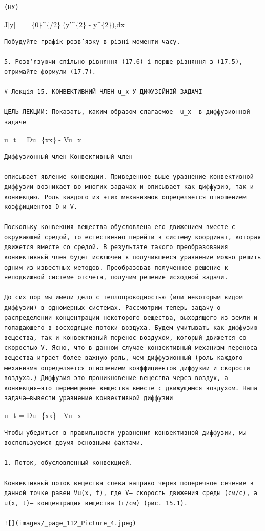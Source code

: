 \documentclass[
  ukrainian,
]{article}
\begin{document}
\begin{verbatim}
(НУ)
\end{verbatim}

J{[}y{]} = \int\_\{0\}\^{}\{\pi/2\} (y'\^{}\{2\} - y\^{}\{2\}),dx

\begin{verbatim}
Побудуйте графік розв’язку в різні моменти часу.

5. Розв’язуючи спільно рівняння (17.6) і перше рівняння з (17.5), отримайте формули (17.7).

# Лекція 15. КОНВЕКТИВНИЙ ЧЛЕН u_x У ДИФУЗІЙНІЙ ЗАДАЧІ

ЦЕЛЬ ЛЕКЦИИ: Показать, каким образом слагаемое  u_x  в диффузионной задаче
\end{verbatim}

u\_t = Du\_\{xx\} - Vu\_x

\begin{verbatim}
Диффузионный член Конвективный член

описывает явление конвекции. Приведенное выше уравнение конвективной диффузии возникает во многих задачах и описывает как диффузию, так и конвекцию. Роль каждого из этих механизмов определяется отношением коэффициентов D и V.

Поскольку конвекция вещества обусловлена его движением вместе с окружающей средой, то естественно перейти в систему координат, которая движется вместе со средой. В результате такого преобразования конвективный член будет исключен в получившееся уравнение можно решить одним из известных методов. Преобразовав полученное решение к неподвижной системе отсчета, получим решение исходной задачи.

До сих пор мы имели дело с теплопроводностью (или некоторым видом диффузии) в одномерных системах. Рассмотрим теперь задачу о распределении концентрации некоторого вещества, выходящего из земли и попадающего в восходящие потоки воздуха. Будем учитывать как диффузию вещества, так и конвективный перенос воздухом, который движется со скоростью V. Ясно, что в данном случае конвективный механизм переноса вещества играет более важную роль, чем диффузионный (роль каждого механизма определяется отношением коэффициентов диффузии и скорости воздуха.) Диффузия—это проникновение вещества через воздух, а конвекция—это перемещение вещества вместе с движущимся воздухом. Наша задача—вывести уравнение конвективной диффузии
\end{verbatim}

u\_t = Du\_\{xx\} - Vu\_x

\begin{verbatim}
Чтобы убедиться в правильности уравнения конвективной диффузии, мы воспользуемся двумя основными фактами.

1. Поток, обусловленный конвекцией.

Конвективный поток вещества слева направо через поперечное сечение в данной точке равен Vu(x, t), где V— скорость движения среды (см/с), а u(x, t)— концентрация вещества (г/см) (рис. 15.1).

![](images/_page_112_Picture_4.jpeg)
\end{verbatim}
\end{document}
